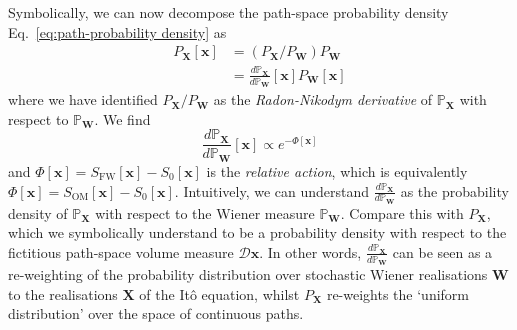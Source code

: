 Symbolically, we can now decompose the path-space probability density Eq.~\ref{eq:path-probability density} as
\begin{equation}
\begin{aligned}
P_\mathbf{X}[\mathbf{x}] & = (P_\mathbf{X} / P_\mathbf{W}) P_\mathbf{W}   \\
 & = \frac{d \mathbb{P}_\mathbf{X}}{d \mathbb{P}_\mathbf{W}}[\mathbf{x}] P_\mathbf{W}[\mathbf{x}]
\end{aligned}
\end{equation}
where we have identified $P_\mathbf{X} / P_\mathbf{W}$ as the \textit{Radon-Nikodym derivative} of $\mathbb{P}_\mathbf{X}$ with respect to $\mathbb{P}_\mathbf{W}$. We find
\begin{equation} \label{eq:radon-nikodym derivative of Px}
\frac{d \mathbb{P}_\mathbf{X}}{d \mathbb{P}_\mathbf{W}}[\mathbf{x}] \propto e^{-\Phi[\mathbf{x}]} 
\end{equation}
and $\Phi[\mathbf{x}] = S_\text{FW}[\mathbf{x}] - S_0[\mathbf{x}]$ is the \textit{relative action}, which is equivalently $\Phi[\mathbf{x}] = S_\text{OM}[\mathbf{x}] - S_0[\mathbf{x}]$. Intuitively, we can understand $\frac{d \mathbb{P}_\mathbf{X}}{d \mathbb{P}_\mathbf{W}}$ as the probability density of $\mathbb{P}_\mathbf{X}$ with respect to the Wiener measure $\mathbb{P}_\mathbf{W}$. Compare this with $P_\mathbf{X}$, which we symbolically understand to be a probability density with respect to the fictitious path-space volume measure $\mathcal{D} \mathbf{x}$. In other words, $\frac{d \mathbb{P}_\mathbf{X}}{d \mathbb{P}_\mathbf{W}}$ can be seen as a re-weighting of the probability distribution over stochastic Wiener realisations $\mathbf{W}$ to the realisations $\mathbf{X}$ of the It\^{o} equation, whilst $P_\mathbf{X}$ re-weights the `uniform distribution' over the space of continuous paths.


